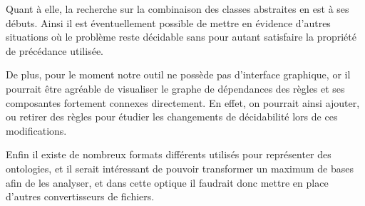 Quant à elle, la recherche sur la combinaison des classes abstraites en est à ses débuts. 
Ainsi il est
éventuellement possible de mettre en évidence d'autres situations où le problème reste
décidable sans pour autant satisfaire la propriété de précédance utilisée.

De plus, pour le moment notre outil ne possède pas d'interface graphique, or il pourrait
être
agréable de visualiser le graphe de dépendances des règles et ses composantes fortement 
connexes directement. En effet, on pourrait ainsi ajouter, ou retirer des règles pour
étudier les changements de décidabilité lors de ces modifications.

Enfin il existe de nombreux formats différents utilisés pour représenter des ontologies,
et il serait intéressant de pouvoir transformer un maximum de bases afin de les
analyser, et dans cette optique il faudrait donc mettre en place d'autres convertisseurs
de fichiers.

